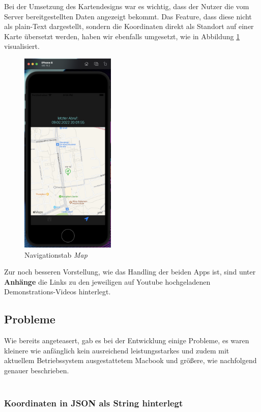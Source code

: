 Bei der Umsetzung  des Kartendesigns war es wichtig, dass der Nutzer die vom Server bereitgestellten Daten angezeigt bekommt. Das  Feature, dass diese nicht als plain-Text dargestellt, sondern die Koordinaten direkt als Standort auf einer Karte übersetzt werden, haben wir ebenfalls umgesetzt, wie in Abbildung \ref{Map} visualisiert.
\begin{figure} [H]
	\begin{center}
		\includegraphics[width=0.4\textwidth]{Bilder/iOS_map.png}
		\caption{Navigationstab \textit{Map}}
		\label{Map}
	\end{center}
\end{figure}
Zur noch besseren Vorstellung, wie das Handling der beiden Apps ist, sind unter \textbf{Anhänge} die Links zu den jeweiligen auf Youtube hochgeladenen Demonstrations-Videos hinterlegt.



\subsection{Probleme}
Wie bereits angeteasert, gab es bei der Entwicklung einige Probleme, es waren kleinere wie anfänglich kein ausreichend leistungsstarkes und zudem mit aktuellem Betriebssystem ausgestattetem Macbook und größere, wie nachfolgend genauer beschrieben.
\\
\\
\subsubsection{Koordinaten in JSON als String hinterlegt}

